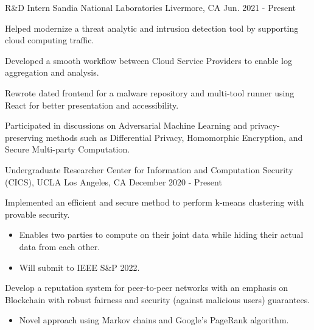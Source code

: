 

\begin{cventries}

  \cventry
    {R\&D Intern} %
    {Sandia National Laboratories} %
    {Livermore, CA} %
    {Jun. 2021 - Present} %
    {
      \begin{cvitems} %
        \item{Helped modernize a threat analytic and intrusion detection tool by supporting cloud computing traffic.}
        \item{Developed a smooth workflow between Cloud Service Providers to enable log aggregation and analysis.}
        \item{Rewrote dated frontend for a malware repository and multi-tool runner using React for better presentation and accessibility.}
        \item{Participated in discussions on Adversarial Machine Learning and privacy-preserving methods such as Differential Privacy, Homomorphic Encryption, and Secure Multi-party Computation.}
      \end{cvitems}
    }

  \cventry
    {Undergraduate Researcher} %
    {Center for Information and Computation Security (CICS), UCLA} %
    {Los Angeles, CA} %
    {December 2020 - Present} %
    {
      \begin{cvitems} %
        \item{Implemented an efficient and secure method to perform k-means clustering with provable security.}
        \begin{itemize}
          \item{Enables two parties to compute on their joint data while hiding their actual data from each other.}
          \item{Will submit to IEEE S\&P 2022.}
        \end{itemize}
        \item{Develop a reputation system for peer-to-peer networks with an emphasis on Blockchain with robust fairness and security (against malicious users) guarantees.}
        \begin{itemize}
          \item{Novel approach using Markov chains and Google's PageRank algorithm.}
        \end{itemize}
      \end{cvitems}
    }


\end{cventries}
